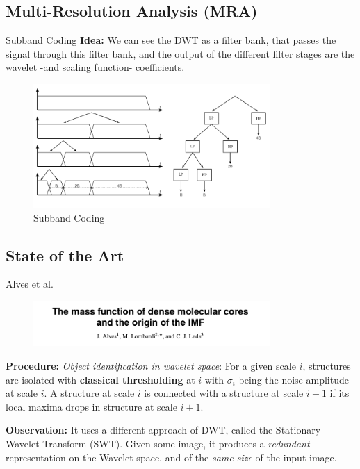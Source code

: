\documentclass{beamer}
\begin{document}
\subsection{Multi-Resolution Analysis (MRA)}
\begin{frame}{Subband Coding}
\textbf{Idea:} We can see the DWT as a filter bank, that passes the signal through
this filter bank, and the output of the different filter stages are the wavelet -and
scaling function- coefficients.
\begin{figure}[htpb!]
\centering
\includegraphics[width=9cm]{mra}
\caption{Subband Coding}
\end{figure}

    
\end{frame}


\subsection{State of the Art}

\begin{frame}{Alves et al.}

\begin{figure}[htpb!]
\centering
\includegraphics[width=9cm]{alves}
\end{figure}

\textbf{Procedure:} \textit{Object identification in wavelet space}:
For a given scale $i$, structures are isolated with \textbf{classical thresholding}
at $i$ with $\sigma_i$ being the noise amplitude at scale $i$. A structure at scale
$i$ is connected with a structure at scale $i+1$ if its local maxima drops in structure
at scale $i +1$.

\textbf{Observation:} It uses a different approach of DWT, called the Stationary Wavelet Transform
(SWT). Given some image, it produces a \textit{redundant} representation on the Wavelet space, and
of the \textit{same size} of the input image.
\end{frame}
\end{document}
